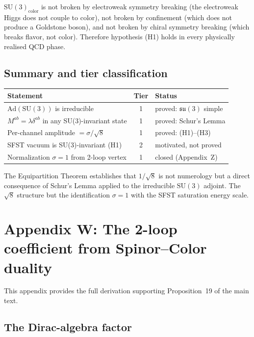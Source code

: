 \documentclass[11pt,a4paper]{article}
\begin{document}
$\mathrm{SU}(3)_{\mathrm{color}}$ is not broken by electroweak symmetry breaking
(the electroweak Higgs does not couple to color), not broken by confinement (which
does not produce a Goldstone boson), and not broken by chiral symmetry breaking
(which breaks flavor, not color).  Therefore hypothesis (H1) holds in every
physically realised QCD phase.

\subsection{Summary and tier classification}

\begin{center}
\renewcommand{\arraystretch}{1.3}
\begin{tabular}{p{}cp{}}
\toprule
Statement & Tier & Status\\
\midrule
$\mathrm{Ad}(\mathrm{SU}(3))$ is irreducible & 1 & proved: $\mathfrak{su}(3)$ simple\\
$M^{ab}=\lambda\delta^{ab}$ in any SU(3)-invariant state & 1 & proved: Schur's Lemma\\
Per-channel amplitude $=\sigma/\sqrt{8}$ & 1 & proved: (H1)--(H3)\\
SFST vacuum is SU(3)-invariant (H1) & 2 & motivated, not proved\\
Normalization $\sigma=1$ from 2-loop vertex & 1 & closed (Appendix~Z)\\
\bottomrule
\end{tabular}
\end{center}

The Equipartition Theorem establishes that $1/\sqrt{8}$ is not numerology
but a direct consequence of Schur's Lemma applied to the irreducible
$\mathrm{SU}(3)$ adjoint.  The $\sqrt{8}$
structure but the identification $\sigma=1$ with the SFST saturation energy scale.

\section{Appendix W: The 2-loop coefficient from Spinor--Color duality}
\label{sec:spinorcolor}

This appendix provides the full derivation supporting
Proposition~19 of the main text.

\subsection{The Dirac-algebra factor}
\end{document}
